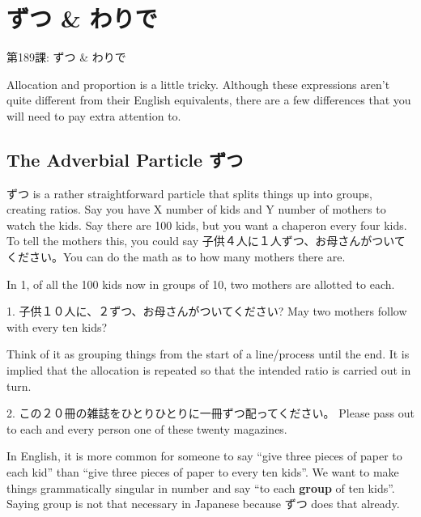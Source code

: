     
\chapter{ずつ \& わりで}

\begin{center}
\begin{Large}
第189課: ずつ \& わりで 
\end{Large}
\end{center}
 
\par{ Allocation and proportion is a little tricky. Although these expressions aren't quite different from their English equivalents, there are a few differences that you will need to pay extra attention to. }
      
\section{The Adverbial Particle ずつ}
 
\par{ ずつ is a rather straightforward particle that splits things up into groups, creating ratios. Say you have X number of kids and Y number of mothers to watch the kids. Say there are 100 kids, but you want a chaperon every four kids. To tell the mothers this, you could say 子供４人に１人ずつ、お母さんがついてください。You can do the math as to how many mothers there are. }

\par{ In 1, of all the 100 kids now in groups of 10, two mothers are allotted to each. }

\par{1. 子供１０人に、２ずつ、お母さんがついてください? \hfill\break
May two mothers follow with every ten kids? }

\par{ Think of it as grouping things from the start of a line\slash process until the end. It is implied that the allocation is repeated so that the intended ratio is carried out in turn. }

\par{2. この２０冊の雑誌をひとりひとりに一冊ずつ配ってください。 \hfill\break
Please pass out to each and every person one of these twenty magazines. }

\par{ In English, it is more common for someone to say “give three pieces of paper to each kid” than “give three pieces of paper to every ten kids”. We want to make things grammatically singular in number and say “to each \textbf{group }of ten kids”. Saying group is not that necessary in Japanese because ずつ does that already. }

